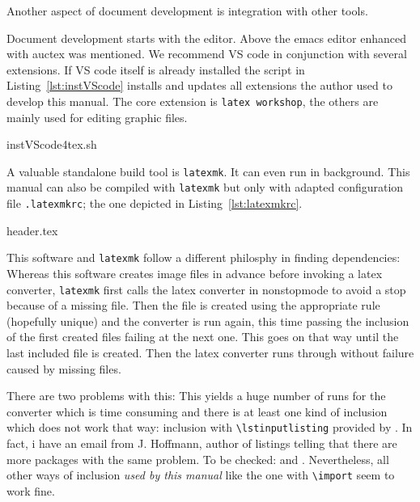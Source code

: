 Another aspect of document development is integration with other tools. 

Document development starts with the editor. 
Above the emacs editor enhanced with auctex was mentioned. 
We recommend VS code in conjunction with several extensions. 
If VS code itself is already installed 
the script in Listing~\ref{lst:instVScode} installs and updates all extensions 
the author used to develop this manual. 
The core extension is \texttt{latex workshop}, 
the others are mainly used for editing graphic files. 

%
{instVScode4tex.sh}


A valuable standalone build tool is \texttt{latexmk}. 
It can even run in background. 
This manual can also be compiled with \texttt{latexmk} 
but only with adapted configuration file \texttt{.latexmkrc}; 
the one depicted in Listing~\ref{lst:latexmkrc}. 

%
{header.tex}


This software and \texttt{latexmk} follow a different philosphy in finding dependencies: 
Whereas this software creates image files in advance before invoking a latex converter, 
\texttt{latexmk} first calls the latex converter in nonstopmode 
to avoid a stop because of a missing file. 
Then the file is created using the appropriate rule (hopefully unique) 
and the converter is run again, 
this time passing the inclusion of the first created files 
failing at the next one. 
This goes on that way until the last included file is created. 
Then the latex converter runs through without failure caused by missing files. 

There are two problems with this: 
This yields a huge number of runs for the converter 
which is time consuming 
and there is at least one kind of inclusion which does not work that way: 
inclusion with \texttt{\textbackslash lstinputlisting} 
provided by . 
In fact, i have an email from J. Hoffmann, author of listings 
telling that there are more packages with the same problem. 
To be checked:  and . 
Nevertheless, all other ways of inclusion \emph{used by this manual} 
like the one with \texttt{\textbackslash import} 
seem to work fine. 

